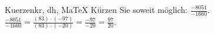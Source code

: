 \begin{MAufgabe}{Kuerzen}{kr, dh, MaTeX}
K\"urzen Sie soweit m\"oglich: $\frac{-8051}{-1660}$.\\ 
\ifLsg\MLoesung
\quad $\frac{-8051}{-1660}=\frac{(83)\cdot(-97)}{(83)\cdot(-20)}=\frac{-97}{-20}=\frac{97}{20}$.\else\relax\fi
 \end{MAufgabe}